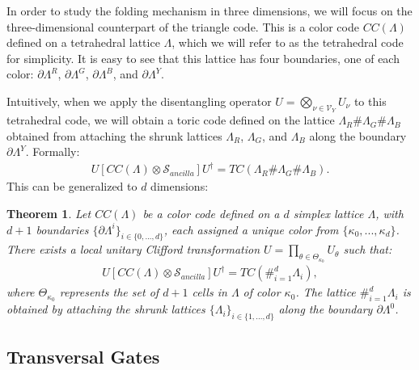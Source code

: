\documentclass[12pt]{article}
\newtheorem{theorem}{Theorem}[section]
\theoremstyle{definition}
\begin{document}
In order to study the folding mechanism in three dimensions, we will focus on the three-dimensional counterpart of the triangle code. This is a color code $CC(\Lambda)$ defined on a tetrahedral lattice $\Lambda$, which we will refer to as the tetrahedral code for simplicity. It is easy to see that this lattice has four boundaries, one of each color: $\partial\Lambda^R$, $\partial\Lambda^G$, $\partial\Lambda^B$, and $\partial\Lambda^Y$.\newline

Intuitively, when we apply the disentangling operator $U = \bigotimes_{\nu\in\mathcal{V}_Y}U_\nu$ to this tetrahedral code, we will obtain a toric code defined on the lattice $\Lambda_R\#\Lambda_G\#\Lambda_B$ obtained from attaching the shrunk lattices $\Lambda_R$, $\Lambda_G$, and $\Lambda_B$ along the boundary $\partial\Lambda^Y$. Formally:
    \begin{align}
        U[CC(\Lambda)\otimes\mathcal{S}_{ancilla}]U^\dagger = TC(\Lambda_R\#\Lambda_G\#\Lambda_B).
    \end{align}\newpage
This can be generalized to $d$ dimensions:
    \begin{theorem}
        Let $CC(\Lambda)$ be a color code defined on a $d$ simplex lattice $\Lambda$, with $d+1$ boundaries $\{\partial\Lambda^i\}_{i\in\{0,...,d\}}$, each assigned a unique color from $\{\kappa_0,...,\kappa_d\}$. There exists a local unitary Clifford transformation $U = \prod_{\theta\in\Theta_{\kappa_0}}U_\theta$ such that:
            \begin{align}
                U[CC(\Lambda)\otimes\mathcal{S}_{ancilla}]U^\dagger = TC(\#^d_{i = 1}\Lambda_i),
            \end{align}
        where $\Theta_{\kappa_0}$ represents the set of $d+1$ cells in $\Lambda$ of color $\kappa_0$. The lattice $\#^d_{i = 1}\Lambda_i$ is obtained by attaching the shrunk lattices $\{\Lambda_i\}_{i\in\{1,...,d\}}$ along the boundary $\partial\Lambda^0$.
    \end{theorem}

\subsection{Transversal Gates}
\end{document}
